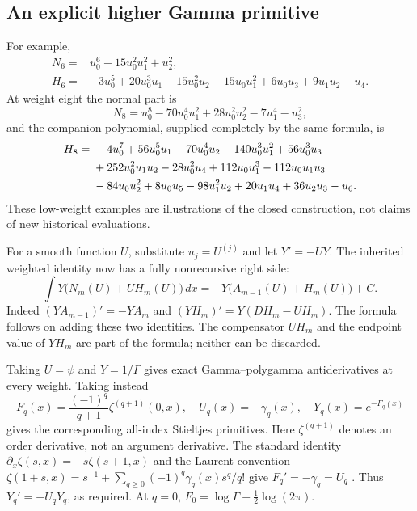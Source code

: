 \subsection{An explicit higher Gamma primitive}

For example,
\begin{align}
 N_6={}&u_0^6-15u_0^2u_1^2+u_2^2,\label{hp:N6}\\
 H_6={}&-3u_0^5+20u_0^3u_1-15u_0^2u_2-15u_0u_1^2
             +6u_0u_3+9u_1u_2-u_4.\label{hp:H6}
\end{align}
At weight eight the normal part is
\begin{equation}\label{hp:N8}
 N_8=u_0^8-70u_0^4u_1^2+28u_0^2u_2^2-7u_1^4-u_3^2,
\end{equation}
and the companion polynomial, supplied completely by the same formula, is
\begin{align}
 H_8={}&-4u_0^7+56u_0^5u_1-70u_0^4u_2-140u_0^3u_1^2
              +56u_0^3u_3\notag\\
      &+252u_0^2u_1u_2-28u_0^2u_4+112u_0u_1^3
              -112u_0u_1u_3\notag\\
      &-84u_0u_2^2+8u_0u_5-98u_1^2u_2+20u_1u_4
              +36u_2u_3-u_6.\label{hp:H8}
\end{align}
These low-weight examples are illustrations of the closed construction,
not claims of new historical evaluations.

For a smooth function $U$, substitute $u_j=U^{(j)}$ and let $Y'=-UY$.
The inherited weighted identity now has a fully nonrecursive right side:
\begin{equation}\label{hp:weighted}
 \boxed{\displaystyle
 \int Y\bigl(N_m(U)+U H_m(U)\bigr)\,dx
       =-Y\bigl(A_{m-1}(U)+H_m(U)\bigr)+C.}
\end{equation}
Indeed $(YA_{m-1})'=-YA_m$ and
$(YH_m)'=Y(DH_m-UH_m)$. The formula follows on adding these two
identities. The compensator $UH_m$ and the endpoint value of $YH_m$
are part of the formula; neither can be discarded.

Taking $U=\psi$ and $Y=1/\Gamma$ gives exact Gamma--polygamma
antiderivatives at every weight. Taking instead
\begin{equation}\label{hp:StieltjesU}
 F_q(x)=\frac{(-1)^q}{q+1}\zeta^{(q+1)}(0,x),\quad
 U_q(x)=-\gamma_q(x),\quad Y_q(x)=e^{-F_q(x)}
\end{equation}
gives the corresponding all-index Stieltjes primitives.
Here $\zeta^{(q+1)}$ denotes an order derivative, not an argument
derivative. The standard identity
$\partial_x\zeta(s,x)=-s\zeta(s+1,x)$ and the Laurent convention
$\zeta(1+s,x)=s^{-1}+\sum_{q\ge0}(-1)^q\gamma_q(x)s^q/q!$
give $F_q'=-\gamma_q=U_q$ \cite{DLMFHurwitz}.
Thus $Y_q'=-U_qY_q$, as required. At $q=0$,
$F_0=\log\Gamma-\tfrac12\log(2\pi)$.

